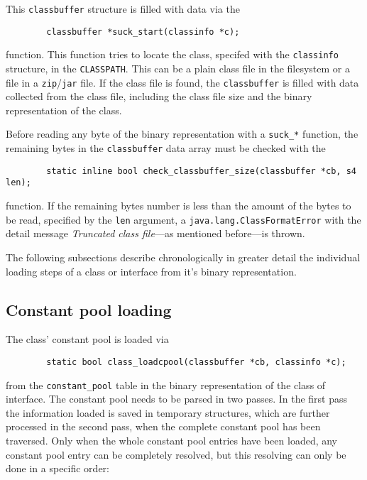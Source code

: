 This \texttt{classbuffer} structure is filled with data via the

\begin{verbatim}
        classbuffer *suck_start(classinfo *c);
\end{verbatim}

function. This function tries to locate the class, specifed with the
\texttt{classinfo} structure, in the \texttt{CLASSPATH}. This can be
a plain class file in the filesystem or a file in a
\texttt{zip}/\texttt{jar} file. If the class file is found, the
\texttt{classbuffer} is filled with data collected from the class
file, including the class file size and the binary representation of
the class.

Before reading any byte of the binary representation with a
\texttt{suck\_*} function, the remaining bytes in the
\texttt{classbuffer} data array must be checked with the

\begin{verbatim}
        static inline bool check_classbuffer_size(classbuffer *cb, s4 len);
\end{verbatim}

function. If the remaining bytes number is less than the amount of the
bytes to be read, specified by the \texttt{len} argument, a
\texttt{java.lang.ClassFormatError} with the detail message
\textit{Truncated class file}---as mentioned before---is thrown.

The following subsections describe chronologically in greater detail
the individual loading steps of a class or interface from it's binary
representation.


\subsection{Constant pool loading}
\label{sectionconstantpoolloading}

The class' constant pool is loaded via

\begin{verbatim}
        static bool class_loadcpool(classbuffer *cb, classinfo *c);
\end{verbatim}

from the \texttt{constant\_pool} table in the binary representation of
the class of interface. The constant pool needs to be parsed in two
passes. In the first pass the information loaded is saved in temporary
structures, which are further processed in the second pass, when the
complete constant pool has been traversed. Only when the whole
constant pool entries have been loaded, any constant pool entry can be
completely resolved, but this resolving can only be done in a specific
order:

